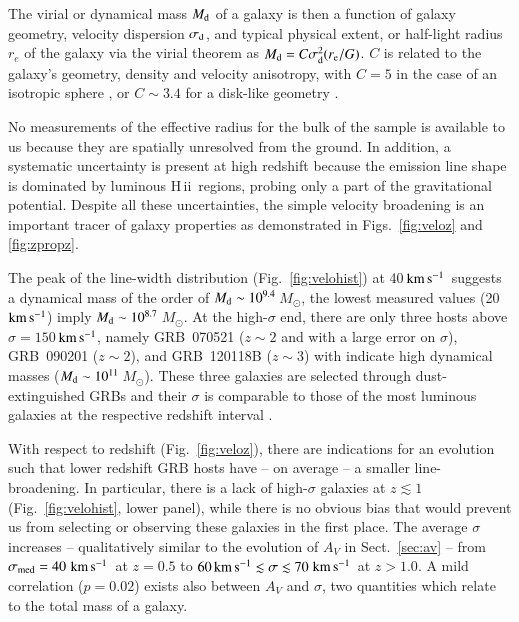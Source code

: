\documentclass[traditabstract, longauth]{aa}
\newcommand{\kms}{$\rm{km\,s^{-1}}$}
\newcommand{\hii}{\mbox{H\,{\sc ii}}}
\newcommand{\Msun}{$M_\odot$}
\begin{document}
The virial or dynamical mass $M_{\rm{d}}$ of a galaxy is then a function of galaxy geometry, velocity dispersion $\sigma_{\rm{d}}$, and typical physical extent, or half-light radius $r_{e}$ of the galaxy via the virial theorem \citep[see e.g.,][]{2001ApJ...554..981P} as $M_{\rm{d}} = C\sigma_{\rm{d}}^2(r_{\rm{e}}/G)$. $C$ is related to the galaxy's geometry, density and velocity anisotropy, with $C=5$ in the case of an isotropic sphere \citep{2001ApJ...554..981P}, or $C\sim3.4$ for a disk-like geometry \citep{2006ApJ...646..107E}.

No measurements of the effective radius for the bulk of the sample is available to us because they are spatially unresolved from the ground.  {In addition, a systematic uncertainty is present at high redshift because the emission line shape is dominated by luminous \hii\, regions, probing only a part of the gravitational potential. Despite all these uncertainties, the simple velocity broadening is an important tracer of galaxy properties as demonstrated in Figs.~\ref{fig:veloz} and \ref{fig:zpropz}.} 

The peak of the line-width distribution (Fig.~\ref{fig:velohist}) at 40\,\kms\, suggests a dynamical mass of the order of $M_{\rm{d}} \sim 10^{9.4}$\,\Msun, the lowest measured values (20\,\kms) imply $M_{\rm{d}} \sim 10^{8.7}$\,\Msun. At the high-$\sigma$ end, there are only three hosts above $\sigma=150$\,\kms, namely GRB~070521 ($z\sim2$ and with a large error on $\sigma$), GRB~090201 ($z\sim2$), and GRB~120118B ($z\sim3$) with indicate high dynamical masses ($M_{\rm{d}} \sim 10^{11}$\,\Msun). These three galaxies are selected through dust-extinguished GRBs and their $\sigma$ is comparable to those of the most luminous galaxies at the respective redshift interval \citep[e.g.,][]{2006ApJ...646..107E}.

With respect to redshift (Fig.~\ref{fig:veloz}), there are indications for an evolution such that lower redshift GRB hosts have -- on average -- a smaller line-broadening. In particular, there is a lack of high-$\sigma$ galaxies at $z\lesssim1$ (Fig.~\ref{fig:velohist}, lower panel), while there is no obvious bias that would prevent us from selecting or observing these galaxies in the first place. The average $\sigma$ increases -- qualitatively similar to the evolution of $A_V$ in Sect.~\ref{sec:av} -- from $\sigma_{\rm{med}}=40\,$\kms\, at $z=0.5$ to $60\,\rm{km\,s^{-1}}\lesssim \sigma \lesssim 70\,$\kms\, at $z>1.0$. A mild correlation ($p=0.02$) exists also between $A_V$ and $\sigma$, two quantities which relate to the total mass of a galaxy.
 
\end{document}
